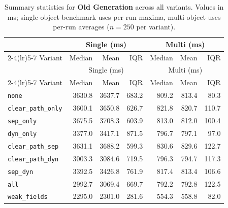 \begin{longtable}{l rrr rrr}
\caption[Old Generation summary statistics]{Summary statistics for \textbf{Old Generation} across all variants. Values in ms; single-object benchmark uses per-run maxima, multi-object uses per-run averages ($n=250$ per variant).}\label{tab:stats-oldgen} \\
\toprule
 & \multicolumn{3}{c}{Single (ms)} & \multicolumn{3}{c}{Multi (ms)} \\
\cmidrule(lr){2-4}\cmidrule(lr){5-7}
Variant & Median & Mean & IQR & Median & Mean & IQR \\
\midrule
\endfirsthead
\toprule
 & \multicolumn{3}{c}{Single (ms)} & \multicolumn{3}{c}{Multi (ms)} \\
\cmidrule(lr){2-4}\cmidrule(lr){5-7}
Variant & Median & Mean & IQR & Median & Mean & IQR \\
\midrule
\endhead
\bottomrule
\endfoot
\texttt{none} & 3630.8 & 3637.7 & 683.2 & 809.2 & 813.4 & 80.3 \\
\texttt{clear\_path\_only} & 3600.1 & 3650.8 & 626.7 & 821.8 & 820.7 & 110.7 \\
\texttt{sep\_only} & 3675.5 & 3708.3 & 603.9 & 813.0 & 812.0 & 100.4 \\
\texttt{dyn\_only} & 3377.0 & 3417.1 & 871.5 & 796.7 & 797.1 & 97.0 \\
\texttt{clear\_path\_sep} & 3631.1 & 3688.2 & 599.3 & 830.6 & 829.6 & 122.7 \\
\texttt{clear\_path\_dyn} & 3003.3 & 3084.6 & 719.5 & 796.3 & 794.7 & 117.3 \\
\texttt{sep\_dyn} & 3392.5 & 3426.8 & 761.9 & 817.4 & 813.4 & 106.6 \\
\texttt{all} & 2992.7 & 3069.4 & 669.7 & 792.2 & 792.8 & 122.5 \\
\texttt{weak\_fields} & 2295.0 & 2301.0 & 281.6 & 554.3 & 558.8 & 82.0 \\
\end{longtable}
